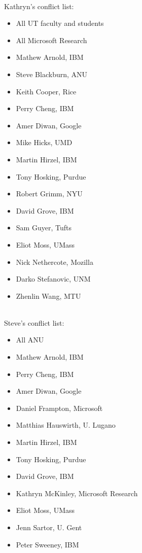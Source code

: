\ \\ 
Kathryn's conflict list:

\begin{itemize}
\item All UT faculty and students
\item All Microsoft Research
\item Mathew Arnold, IBM
\item Steve Blackburn, ANU
\item Keith Cooper, Rice
\item Perry Cheng, IBM
\item Amer Diwan, Google
\item Mike Hicks, UMD
\item Martin Hirzel, IBM
\item Tony Hosking, Purdue
\item Robert Grimm, NYU
\item David Grove, IBM
\item Sam Guyer, Tufts
\item Eliot Moss, UMass
\item Nick Nethercote, Mozilla
\item Darko Stefanovic, UNM
\item Zhenlin Wang, MTU

\end{itemize}

\ \\ 
Steve's conflict list:

\begin{itemize}
\item All ANU
\item Mathew Arnold, IBM
\item Perry Cheng, IBM
\item Amer Diwan, Google
\item Daniel Frampton, Microsoft
\item Matthias Hauswirth, U. Lugano
\item Martin Hirzel, IBM
\item Tony Hosking, Purdue
\item David Grove, IBM
\item Kathryn McKinley, Microsoft Research
\item Eliot Moss, UMass
\item Jenn Sartor, U. Gent
\item Peter Sweeney, IBM

\end{itemize}

